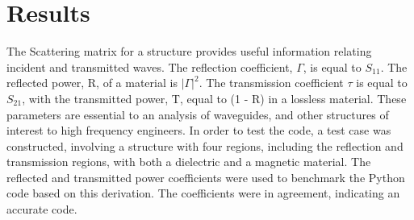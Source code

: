 \section{Results} \label{sec:results}
The Scattering matrix for a structure provides useful information relating 
incident and transmitted waves.  The reflection coefficient, $\Gamma$, is equal 
to $S_{11}$.  The reflected power, R, of a material is $ |\Gamma|^2$.  The 
transmission coefficient $\tau$ is equal to $S_{21}$, with the transmitted 
power, T, equal to (1 - R) in a lossless material.  These parameters are 
essential to an analysis of waveguides, and other structures of interest to high 
frequency engineers.  In order to test the code, a test case was constructed, 
involving a structure with four regions, including the reflection and 
transmission regions, with both a dielectric and a magnetic material.  The 
reflected and transmitted power coefficients were used to benchmark the Python 
code based on this derivation.  The coefficients were in agreement, indicating 
an accurate code. 


